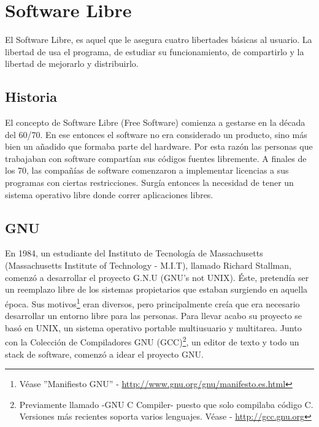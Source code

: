 \section{Software Libre}\label{cap:sw_libre}

El Software Libre, es aquel que le asegura cuatro libertades b\'asicas al
usuario. La libertad de usa el programa, de estudiar su funcionamiento, de
compartirlo y la libertad de mejorarlo y distribuirlo.

\subsection{Historia}
El concepto de Software Libre (Free Software) comienza a gestarse en la 
d\'ecada del 60/70. En ese entonces el software no era considerado un
producto, sino m\'as bien un a\~nadido que formaba parte del hardware. Por esta
raz\'on las personas que trabajaban con software compart\'ian sus c\'odigos
fuentes libremente. A finales de los 70, las compa\~n\'ias de software
comenzaron a implementar licencias a sus programas con ciertas restricciones. 
Surg\'ia entonces la necesidad de tener un sistema operativo libre donde
correr aplicaciones libres.


\subsection{GNU}
En 1984, un estudiante del Instituto de Tecnolog\'ia de Massachusetts
(Massachusetts Institute of Technology - M.I.T), llamado Richard Stallman, 
comenz\'o a desarrollar el proyecto G.N.U (GNU's not UNIX).
\'Este, pretend\'ia ser un reemplazo libre de los sistemas propietarios que 
estaban surgiendo en aquella \'epoca.
Sus motivos\footnote{V\'ease ''Manifiesto GNU'' - 
\url{http://www.gnu.org/gnu/manifesto.es.html}} eran diversos, pero
principalmente 
cre\'ia que era necesario desarrollar un entorno libre para las personas.
Para llevar acabo su proyecto se bas\'o en UNIX, un sistema operativo 
portable multiusuario y multitarea. Junto con la Colecci\'on de Compiladores
GNU (GCC)\footnote{Previamente llamado -GNU C Compiler- puesto que solo
compilaba c\'odigo C. Versiones m\'as recientes soporta varios lenguajes.
V\'ease
- \url{http://gcc.gnu.org}}, un editor de texto y todo un stack de software,
comenz\'o a idear el proyecto GNU.

